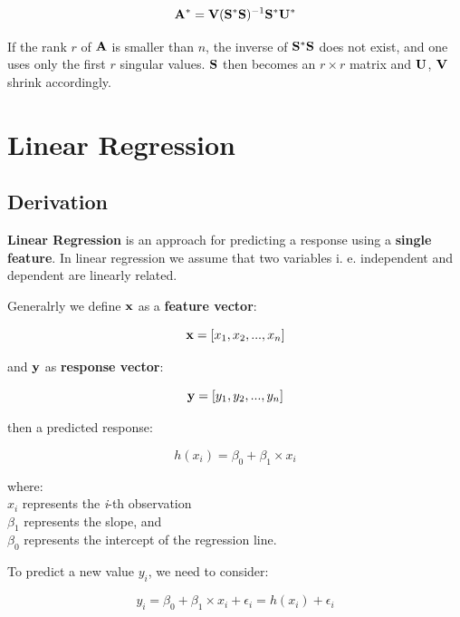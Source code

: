 \begin{equation}
    \mathbf{A}^* = \mathbf{V} ( \mathbf{S}^* \mathbf{S} )^{-1} \mathbf{S}^* \mathbf{U}^*
\end{equation}

If the rank $ r $ of $ \mathbf{A} $ is smaller than $ n $, the inverse of
$ \mathbf{S}^* \mathbf{S} $ does not exist, and one uses only the first $ r $ singular
values. $ \mathbf{S} $ then becomes an $ r \times r $ matrix and $ \mathbf{U}$, $ \mathbf{V} $
shrink accordingly.


\section{Linear Regression}
\subsection{Derivation}

\textbf{Linear Regression} is an approach for predicting a response using
a \textbf{single feature}. In linear regression we assume that two variables
i. e. independent and dependent are linearly related.

Generalrly we define $ \mathbf{x} $ as a \textbf{feature vector}:

\begin{equation}
    \mathbf{x} = \left[ x_1, x_2, ..., x_n \right]
\end{equation}

and $ \mathbf{y} $ as \textbf{response vector}:

\begin{equation}
    \mathbf{y} = \left[ y_1, y_2, ..., y_n \right]
\end{equation}

then a predicted response:

\begin{equation}
    h(x_i) = \beta_0 + \beta_1 \times x_i
\end{equation}

where: \\
$ x_i $ represents the \textit{i}-th observation \\
$ \beta_1 $ represents the slope, and \\
$ \beta_0 $ represents the intercept of the regression line.


To predict a new value $ y_i $, we need to consider:

\begin{equation}
    y_i = \beta_0 + \beta_1 \times x_i + \epsilon_i = h(x_i) + \epsilon_i
\end{equation}

